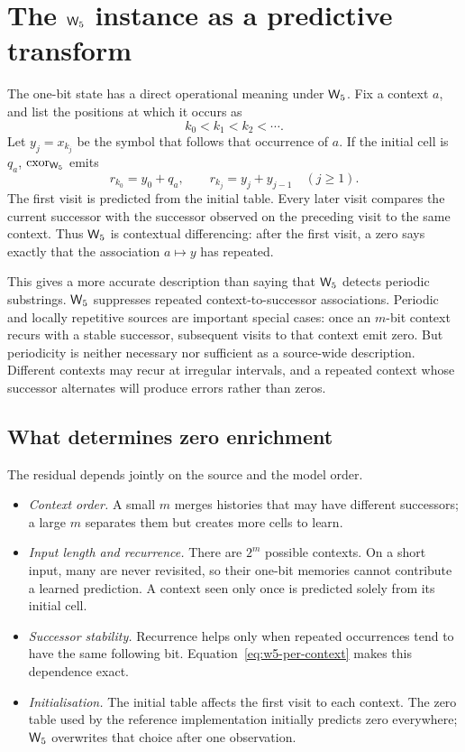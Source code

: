 \section{The \texorpdfstring{$\mathsf{W}_{5}$}{W5} instance as a predictive transform}\label{sec:predictive}

The one-bit state has a direct operational meaning under $\mathsf{W}_{5}$.  Fix a context $a$, and list the
positions at which it occurs as
\[
  k_0<k_1<k_2<\cdots .
\]
Let $y_j=x_{k_j}$ be the symbol that follows that occurrence of $a$.  If the initial cell is
$q_a$, $\mathrm{cxor}_{\mathsf{W}_{5}}$ emits
\begin{equation}\label{eq:w5-per-context}
  r_{k_0}=y_0+q_a,
  \qquad
  r_{k_j}=y_j+y_{j-1}\quad(j\ge1).
\end{equation}
The first visit is predicted from the initial table.  Every later visit compares the current
successor with the successor observed on the preceding visit to the same context.  Thus $\mathsf{W}_{5}$ is
contextual differencing: after the first visit, a zero says exactly that the association
$a\mapsto y$ has repeated.

This gives a more accurate description than saying that $\mathsf{W}_{5}$ detects periodic substrings.
$\mathsf{W}_{5}$ suppresses repeated context-to-successor associations.  Periodic and locally repetitive
sources are important special cases: once an $m$-bit context recurs with a stable successor,
subsequent visits to that context emit zero.  But periodicity is neither necessary nor sufficient
as a source-wide description.  Different contexts may recur at irregular intervals, and a
repeated context whose successor alternates will produce errors rather than zeros.

\subsection{What determines zero enrichment}

The residual depends jointly on the source and the model order.
\begin{itemize}
  \item \emph{Context order.}  A small $m$ merges histories that may have different successors;
        a large $m$ separates them but creates more cells to learn.
  \item \emph{Input length and recurrence.}  There are $2^m$ possible contexts.  On a short input,
        many are never revisited, so their one-bit memories cannot contribute a learned
        prediction.  A context seen only once is predicted solely from its initial cell.
  \item \emph{Successor stability.}  Recurrence helps only when repeated occurrences tend to have
        the same following bit.  Equation~\eqref{eq:w5-per-context} makes this dependence exact.
  \item \emph{Initialisation.}  The initial table affects the first visit to each context.  The
        zero table used by the reference implementation initially predicts zero everywhere;
        $\mathsf{W}_{5}$ overwrites that choice after one observation.
\end{itemize}

